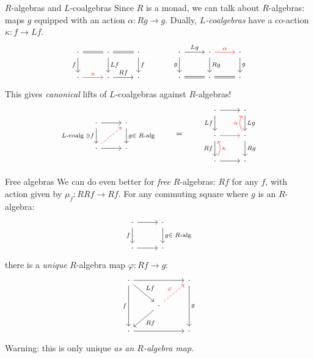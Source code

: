 \documentclass[compress]{beamer}
\newcommand{\1}{\mathbf{1}}
\begin{document}
\begin{frame}[fragile]{$R$-algebras and $L$-coalgebras}
	Since $R$ is a monad, we can talk about $R$-algebras:
	maps $g$ equipped with an action $\alpha \colon Rg \to g$.
	\pause \vfill
	Dually, \emph{$L$-coalgebras} have a co-action $\kappa \colon f \to Lf$.
	\pause
	\[
		\begin{tikzcd}
			\cdot \ar[r,equals] \ar[d, "f"'] & \cdot \ar[r, equals] \ar[d, "Lf"] & \cdot \ar[d, "f"]
			\\
			\cdot \ar[r, "\kappa", red] & \cdot \ar[r, "Rf"] & \cdot
		\end{tikzcd}
		\quad \quad \quad		
		\begin{tikzcd}
			\cdot \ar[d, "g"']  \ar[r, "Lg"] & \cdot \ar[r, "\alpha", red] \ar[d, "Rg"] & \cdot \ar[d, "g"]
			\\
			\cdot \ar[r, equals] & \cdot \ar[r, equals] & \cdot		
		\end{tikzcd}
	\]
	\pause
	This gives \emph{canonical} lifts of $L$-coalgebras against $R$-algebras!
	\[
		\begin{tikzcd}
			\cdot \ar[r] \ar[d, "L\text{-coalg} \; \ni f"'] & \cdot \ar[d, "g \in \; R\text{-alg}"]
			\\
			\cdot \ar[r] \ar[ur, dashed, red] & \cdot
		\end{tikzcd}
		\quad \quad = \quad \quad
		\begin{tikzcd}
			\cdot \ar[r] \ar[d, "Lf"'] & \cdot \ar[d, "Lg"]
			\\
			\cdot \ar[r, red] \ar[d, "Rf"'] & \cdot \ar[d, "Rg"] \ar[u, bend left, "\alpha", red]
			\\
			\cdot \ar[r] \ar[u, bend right, "\kappa"', red] & \cdot
		\end{tikzcd}
	\]
\end{frame}

\begin{frame}[fragile]{Free algebras}
	We can do even better for \emph{free} $R$-algebras: $Rf$ for any $f$, with action given by $\mu_f \colon RRf \to Rf$.
	\pause
	\vfill
	For any commuting square where $g$ is an $R$-algebra: 
	\[
		\begin{tikzcd}
			\cdot \ar[r] \ar[d, "f"'] & \cdot \ar[d, "g \in \; R\text{-alg}"]
			\\
			\cdot \ar[r] & \cdot
		\end{tikzcd}
	\]
	there is a \emph{unique} $R$-algebra map $\varphi \colon Rf \to g$:
	\[
		\begin{tikzcd}
			\cdot \ar[rr] \ar[dd, "f"'] \ar[dr, "Lf"] & & \cdot \ar[dd, "g"]
			\\
			& \cdot \ar[dl, "Rf"] \ar[ur, dashed, "\varphi", red] &
			\\
			\cdot \ar[rr] & & \cdot
		\end{tikzcd}
	\]
	\pause
	Warning: this is only unique \emph{as an $R$-algebra map}.
\end{frame}
\end{document}
